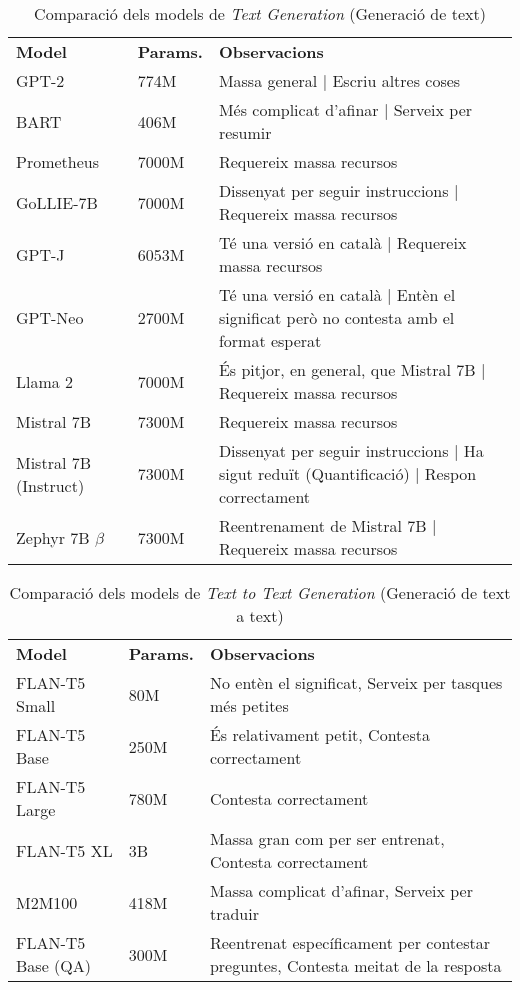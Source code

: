 \begin{table}[H]
  \centering
  \begin{tabular}{|>{\centering}m{2.3cm}|m{1.6cm}|m{10.7cm}|}
    \hline
    \multicolumn{3}{|c|}{\textbf{Models de \textit{Text Generation}}} \\
    \hline
    \textbf{Model} & \textbf{Params.} & \textbf{Observacions} \\
    \hline
    GPT-2 & 774M & Massa general | Escriu altres coses \\
    BART & 406M & Més complicat d'afinar | Serveix per resumir \\
    Prometheus & 7000M & Requereix massa recursos \\
    GoLLIE-7B & 7000M & Dissenyat per seguir instruccions | Requereix massa recursos \\
    GPT-J & 6053M & Té una versió en català | Requereix massa recursos \\
    GPT-Neo & 2700M & Té una versió en català | Entèn el significat però no contesta amb el format esperat \\
    Llama 2 & 7000M & És pitjor, en general, que Mistral 7B | Requereix massa recursos \\
    Mistral 7B & 7300M & Requereix massa recursos \\
    Mistral 7B (Instruct) & 7300M & Dissenyat per seguir instruccions | Ha sigut reduït (Quantificació) | Respon correctament \\
    Zephyr 7B $\beta$ & 7300M & Reentrenament de Mistral 7B | Requereix massa recursos \\
    \hline
  \end{tabular}
  \caption{Comparació dels models de \textit{Text Generation} (Generació de text)}
  \label{tab:tg-comparison}
\end{table}

\begin{table}[H]
  \centering
  \begin{tabular}{|>{\centering}m{2.3cm}|m{1.6cm}|m{10.7cm}|}
    \hline
    \multicolumn{3}{|c|}{\textbf{Models de \textit{Text to Text Generation}}} \\
    \hline
    \textbf{Model} & \textbf{Params.} & \textbf{Observacions} \\
    \hline
    FLAN-T5 Small & 80M & No entèn el significat, Serveix per tasques més petites \\
    FLAN-T5 Base & 250M & És relativament petit, Contesta correctament \\
    FLAN-T5 Large & 780M & Contesta correctament \\
    FLAN-T5 XL & 3B & Massa gran com per ser entrenat, Contesta correctament \\
    M2M100 & 418M & Massa complicat d'afinar, Serveix per traduir \\
    FLAN-T5 Base (QA) & 300M & Reentrenat específicament per contestar preguntes, Contesta meitat de la resposta  \\
    \hline
  \end{tabular}
  \caption{Comparació dels models de \textit{Text to Text Generation} (Generació de text a text)}
  \label{tab:t2t-comparison}
\end{table}

